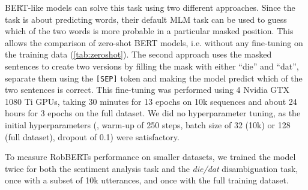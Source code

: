 \documentclass[11pt,a4paper]{article}
\begin{document}
BERT-like models can solve this task using two different approaches.
Since the task is about predicting words, their default MLM task can be used to guess which of the two words is more probable in a particular masked position.
This allows the comparison of zero-shot BERT models, i.e. without any fine-tuning on the training data (\autoref{tab:zeroshot}).
The second approach uses the masked sentences to create two versions by filling the mask with either ``die'' and ``dat'', separate them using the \texttt{[SEP]} token and making the model predict which of the two sentences is correct.
This fine-tuning was performed using 4 Nvidia GTX 1080 Ti GPUs, taking 30 minutes for 13 epochs on 10k sequences and about 24 hours for 3 epochs on the full dataset.
We did no hyperparameter tuning, as the initial hyperparameters (, warm-up of 250 steps, batch size of 32 (10k) or 128 (full dataset), dropout of 0.1) were satisfactory. 

To measure RobBERTs performance on smaller datasets, we trained the model twice for both the sentiment analysis task and the \emph{die/dat} disambiguation task, once with a subset of 10k utterances, and once with the full training dataset.

\begin{table}[htb]
\centering
\caption{Performance of predicting \textit{die/dat} as most likely candidate for a mask using zero-shot BERT models (i.e. without fine-tuning)  as well as a majority class predictor (ZeroR), tested on the 288,799 test set sentences}
\label{tab:zeroshot}
\end{table}
\end{document}
